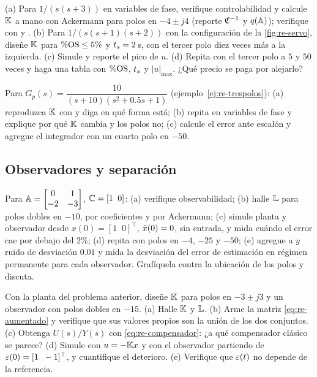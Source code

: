 \begin{problema}\label{prob:re-ackermann}
(a) Para $1/(s(s+3))$ en variables de fase, verifique controlabilidad y calcule $\mathbb{K}$ a mano con Ackermann para polos en $-4\pm j4$ (reporte $\mathfrak{C}^{-1}$ y $q(\mathbb{A})$); verifique con  y . (b) Para $1/(s(s+1)(s+2))$ con la configuración de la \cref{fig:re-servo}, diseñe $\mathbb{K}$ para $\%\mathrm{OS}\leq5\%$ y $t_s=2$\,s, con el tercer polo diez veces más a la izquierda. (c) \etiquetaM{} Simule y reporte el pico de $u$. (d) Repita con el tercer polo a $5$ y $50$ veces y haga una tabla con $\%\mathrm{OS}$, $t_s$ y $|u|_{\max}$. ¿Qué precio se paga por alejarlo?
\end{problema}

\begin{problema}\label{prob:re-representaciones}
Para $G_p(s)=\dfrac{10}{(s+10)(s^2+0.5s+1)}$ (ejemplo~\ref{ej:re-trespolos}): (a) \etiquetaM{} reproduzca $\mathbb{K}$ con  y diga en qué forma está; (b) repita en variables de fase y explique por qué $\mathbb{K}$ cambia y los polos no; (c) calcule el error ante escalón y agregue el integrador con un cuarto polo en $-50$.
\end{problema}

\subsection*{Observadores y separación}

\begin{problema}[observador]\label{prob:re-observador}
Para $\mathbb{A}=\begin{bmatrix}0&1\\-2&-3\end{bmatrix}$, $\mathbb{C}=[1\;\;0]$: (a) verifique observabilidad; (b) halle $\mathbb{L}$ para polos dobles en $-10$, por coeficientes y por Ackermann; (c) \etiquetaM{} simule planta y observador desde $x(0)=[1\;\;0]^\top$, $\tilde{x}(0)=0$, sin entrada, y mida cuándo el error cae por debajo del $2\%$; (d) repita con polos en $-4$, $-25$ y $-50$; (e) \etiquetaM{} agregue a $y$ ruido de desviación $0.01$ y mida la desviación del error de estimación en régimen permanente para cada observador. Grafíquela contra la ubicación de los polos y discuta.
\end{problema}

\begin{problema}\label{prob:re-compensador}
Con la planta del problema anterior, diseñe $\mathbb{K}$ para polos en $-3\pm j3$ y un observador con polos dobles en $-15$. (a) Halle $\mathbb{K}$ y $\mathbb{L}$. (b) Arme la matriz \eqref{eq:re-aumentado} y verifique que sus valores propios son la unión de los dos conjuntos. (c) Obtenga $U(s)/Y(s)$ con \eqref{eq:re-compensador}: ¿a qué compensador clásico se parece? (d) \etiquetaM{} Simule con $u=-\mathbb{K} x$ y con el observador partiendo de $\varepsilon(0)=[1\;\;-1]^\top$, y cuantifique el deterioro. (e) Verifique que $\varepsilon(t)$ no depende de la referencia.
\end{problema}

